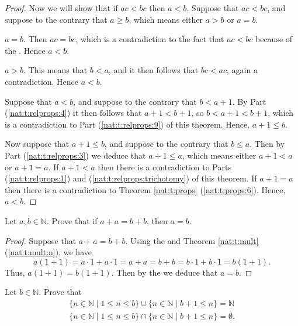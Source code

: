\begin{proof}
	Now we will show that if $a c < b c$ then $a < b$. Suppose that $a c < b c$, and suppose to the contrary that $a \geq b$, which means either $a > b$ or $a = b$.
	\begin{bycases}
		\item $a = b$. Then $a c = b c$, which is a contradiction to the fact that $a c < b c$ because of the . Hence $a < b$.
		\item $a > b$. This means that $b < a$, and it then follows that $b c < a c$, again a contradiction. Hence $a < b$.
	\end{bycases}

	Suppose that $a < b$, and suppose to the contrary that $b < a + 1$. By Part (\ref{nat:t:relprops:4}) it then follows that $a + 1 < b + 1$, so $b < a + 1 < b + 1$, which is a contradiction to Part (\ref{nat:t:relprops:9}) of this theorem. Hence, $a + 1 \leq b$.

	Now suppose that $a + 1 \leq b$, and suppose to the contrary that $b \leq a$. Then by Part (\ref{nat:t:relprops:3}) we deduce that $a + 1 \leq a$, which means either $a + 1 < a$ or $a + 1 = a$. If $a + 1 < a$ then there is a contradiction to Parts (\ref{nat:t:relprops:1}) and (\ref{nat:t:relprops:trichotomy}) of this theorem. If $a + 1 = a$ then there is a contradiction to Theorem \ref{nat:t:props} (\ref{nat:t:props:6}). Hence, $a < b$.
\end{proof}


\Newpage
\begin{exercise} %
	\label{nat:e:5}
	Let $a, b \in \mathbb{N}$. Prove that if $a + a = b + b$, then $a = b$.
\end{exercise}

\begin{proof}
	Suppose that $a + a = b + b$. Using the  and Theorem \ref{nat:t:mult} (\ref{nat:t:mult:n}), we have
	\[
		a(1 + 1) = a \cdot 1 + a \cdot 1 = a + a = b + b = b \cdot 1 + b \cdot 1 = b(1 + 1).
	\]
	Thus, $a(1 + 1) = b(1 + 1)$. Then by the  we deduce that $a = b$.
\end{proof}


\Newpage
\begin{exercise} %
	Let $b \in \mathbb{N}$. Prove that
	\begin{align*}
		\{n \in \mathbb{N} \mid 1 \leq n \leq b\} \cup\{n \in \mathbb{N} \mid b+1 \leq n\} = \mathbb{N} \\
		\{n \in \mathbb{N} \mid 1 \leq n \leq b\} \cap\{n \in \mathbb{N} \mid b+1 \leq n\} = \emptyset.
	\end{align*}
\end{exercise}

